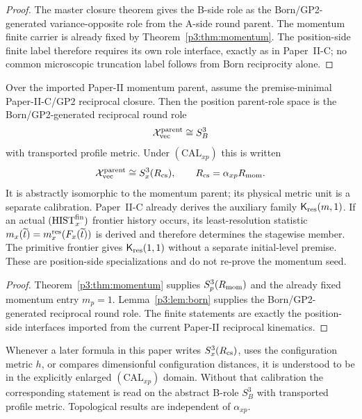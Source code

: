 \documentclass[12pt,a4paper]{article}
\begin{document}
\begin{proof}
The master closure theorem gives the B-side role as the Born/GP2-generated
variance-opposite role from the A-side round parent.  The momentum
finite carrier is already fixed by Theorem~\ref{p3:thm:momentum}.  The
position-side finite label therefore requires its own role interface, exactly
as in Paper~II-C; no common microscopic truncation label follows from Born
reciprocity alone.
\end{proof}


\begin{theorem}
\label{p3:thm:position}
Over the imported Paper-II momentum parent, assume the premise-minimal
Paper-II-C/GP2 reciprocal closure.  Then the position parent-role space is the Born/GP2-generated reciprocal round role
\[
        \mathcal X_{\mathrm{vec}}^{\rm parent}\cong S^3_B
\]
with transported profile metric.  Under \((\mathrm{CAL}_{xp})\) this is written
\[
        \mathcal X_{\mathrm{vec}}^{\rm parent}\cong S^3_x(R_{\mathrm{cs}}),
        \qquad R_{\mathrm{cs}}=\alpha_{xp}R_{\mathrm{mom}}.
\]
It is abstractly isomorphic to the momentum parent; its physical metric unit is
a separate calibration.  Paper~II-C already derives the auxiliary family
$\mathsf K_{\rm res}(m,1)$.  If an actual
$(\mathrm{HIST}_x^{\rm fin})$ frontier history occurs, its least-resolution
statistic $m_x(\widetilde t)=m_x^{\rm res}(F_x(\widetilde t))$ is derived
and therefore determines the stagewise member.  The primitive frontier
gives $\mathsf K_{\rm res}(1,1)$ without a separate initial-level premise.
These are position-side specializations and do not re-prove the momentum seed.
\end{theorem}

\begin{proof}
Theorem~\ref{p3:thm:momentum} supplies $S^3_p(R_{\mathrm{mom}})$ and the already fixed
momentum entry $m_p=1$.  Lemma~\ref{p3:lem:born} supplies the Born/GP2-generated
reciprocal round role.  The finite statements are exactly the
position-side interfaces imported from the current Paper-II reciprocal
kinematics.
\end{proof}

\begin{remark}
\label{p3:rem:reciprocal-scale-calibration}
Whenever a later formula in this paper writes $S^3_x(R_{\mathrm{cs}})$, uses the
configuration metric $h$, or compares dimensionful configuration distances, it
is understood to be in the explicitly enlarged $(\mathrm{CAL}_{xp})$ domain.
Without that calibration the corresponding statement is read on the abstract
B-role $S^3_B$ with transported profile metric.  Topological results are
independent of $\alpha_{xp}$.
\end{remark}
\end{document}
